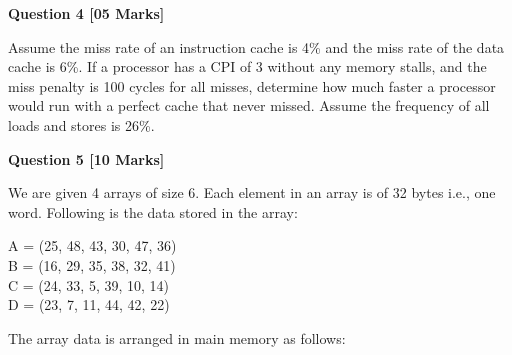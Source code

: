 \documentclass[addpoints]{exam}
\begin{document}
\begin{sloppypar}
\begin{questions}
    \question[05]
    \begin{center}
        \textbf{Question 4 [05 Marks]}
    \end{center}
    Assume the miss rate of an instruction cache is 4\% and the miss rate of the data cache is 6\%. If a processor has a CPI of 3 without any memory stalls, and the miss penalty is 100 cycles for all misses, determine how much faster a processor would run with a perfect cache that never missed. Assume the frequency of all loads and stores is 26\%.
    \begin{solution}
        
    \end{solution}

    \question[10]
    \begin{center}
        \textbf{Question 5 [10 Marks]}
    \end{center}
    We are given 4 arrays of size 6. Each element in an array is of 32 bytes i.e., one word. Following is the data stored in the array:

    A = (25, 48, 43, 30, 47, 36) \\ B = (16, 29, 35, 38, 32, 41) \\ C = (24, 33, 5, 39, 10, 14) \\ D = (23, 7, 11, 44, 42, 22)

    The array data is arranged in main memory as follows:


\end{questions}
\end{sloppypar}
\end{document}

